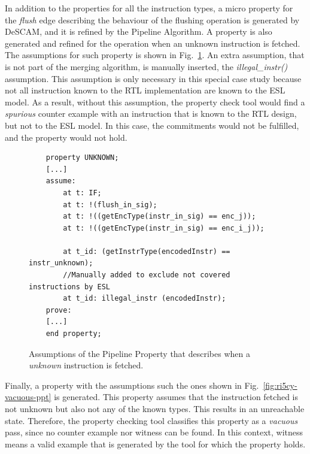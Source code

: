 In addition to the properties for all the instruction types, a micro property for the \textit{flush} edge describing the behaviour of the flushing operation is generated by DeSCAM, and it is refined by the Pipeline Algorithm. A property is also generated and refined for the operation when an unknown instruction is fetched. The assumptions for such property is shown in Fig.~\ref{fig:ri5cy-unknown-ppt}. An extra assumption, that is not part of the merging algorithm, is manually inserted, the \textit{illegal\_instr()} assumption. This assumption is only necessary in this special case study because not all instruction known to the RTL implementation are known to the ESL model. As a result, without this assumption, the property check tool would find a \textit{spurious} counter example with an instruction that is known to the RTL design, but not to the ESL model. In this case, the commitments would not be fulfilled, and the property would not hold. 

\begin{figure}[htb!]
    \begin{lstlisting}
    property UNKNOWN;
    [...]
    assume:
        at t: IF;
        at t: !(flush_in_sig);
        at t: !((getEncType(instr_in_sig) == enc_j));
        at t: !((getEncType(instr_in_sig) == enc_i_j));
        
        at t_id: (getInstrType(encodedInstr) == instr_unknown);
        //Manually added to exclude not covered instructions by ESL
        at t_id: illegal_instr (encodedInstr);
    prove:
    [...]
    end property;\end{lstlisting}
    \caption{Assumptions of the Pipeline Property that describes when a \textit{unknown} instruction is fetched.}
    \label{fig:ri5cy-unknown-ppt}
\end{figure}

Finally, a property with the assumptions such the ones shown in Fig.~\ref{fig:ri5cy-vacuous-ppt} is generated. This property assumes that the instruction fetched is not unknown but also not any of the known types. This results in an unreachable state. Therefore, the property checking tool classifies this property as a \textit{vacuous} pass, since no counter example nor witness can be found. In this context, witness means a valid example that is generated by the tool for which the property holds. 


